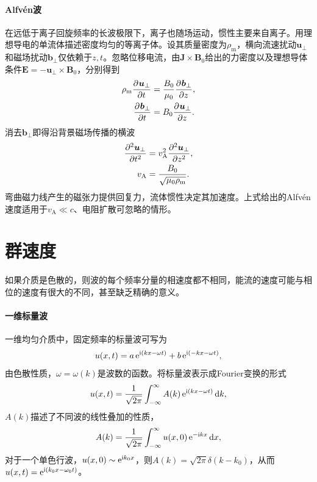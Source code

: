 \paragraph{Alfvén波}
在远低于离子回旋频率的长波极限下，离子也随场运动，惯性主要来自离子。用理想导电的单流体描述密度均匀的等离子体。设其质量密度为$\rho_{\mathrm m}$，横向流速扰动$\bm u_\perp$和磁场扰动$\bm b_\perp$仅依赖于$z,t$。忽略位移电流，由$\bm J \times \bm B_0$给出的力密度以及理想导体条件$\bm E = -\bm u_\perp \times \bm B_0$，分别得到
\begin{subequations}
    \label{eq:ed-alfven-first-order}
    \begin{align}
        \rho_{\mathrm m}\pv{\bm u_\perp}t &= \frac{B_0}{\mu_0}\pv{\bm b_\perp}z,\\
        \pv{\bm b_\perp}t &= B_0\pv{\bm u_\perp}z.
    \end{align}
\end{subequations}
消去$\bm b_\perp$即得沿背景磁场传播的横波
\begin{subequations}
    \begin{align}
        \pv[2]{\bm u_\perp}t &= v_{\mathrm A}^2\pv[2]{\bm u_\perp}z,\\
        v_{\mathrm A} &= \frac{B_0}{\sqrt{\mu_0\rho_{\mathrm m}}}.
    \end{align}
\end{subequations}
弯曲磁力线产生的磁张力提供回复力，流体惯性决定其加速度。上式给出的Alfvén速度适用于$v_{\mathrm A} \ll c$、电阻扩散可忽略的情形。

\section{群速度}

如果介质是色散的，则波的每个频率分量的相速度都不相同，能流的速度可能与相位的速度有很大的不同，甚至缺乏精确的意义。

\paragraph{一维标量波}

一维均匀介质中，固定频率的标量波可写为
\[
    u(x,t) = a\e^{\i(kx-\omega t)} + b\e^{\i(-kx-\omega t)},
\]
由色散性质，$\omega = \omega(k)$是波数的函数。将标量波表示成Fourier变换的形式
\[
    u(x,t) = \frac1{\sqrt{2\pi}}\intR A(k)\e^{\i(kx-\omega t)}\d k,
\]
$A(k)$描述了不同波的线性叠加的性质，
\[
    A(k) = \frac1{\sqrt{2\pi}}\intR u(x,0)\e^{-\i kx}\d x,
\]
对于一个单色行波，$u(x,0) \sim \e^{\i k_0x}$，则$A(k) = \sqrt{2\pi}\delta(k - k_0)$，从而$u(x,t) = \e^{\i(k_0x-\omega_0t)}$。

